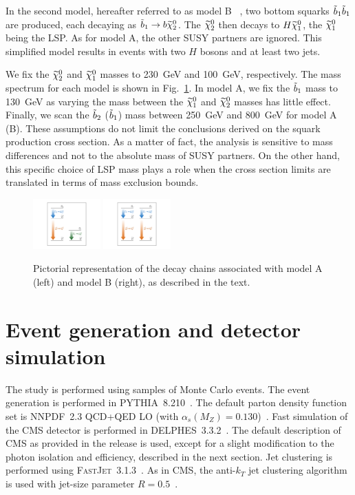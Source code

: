 In the second model, hereafter referred to as model B ~\cite{annthesis}, two bottom
squarks $\tilde{b}_1\tilde{b}_1$ are produced, each decaying as
$\tilde{b}_1 \to b \widetilde{\chi}^{0}_2$. The $\widetilde{\chi}^{0}_2$ then decays to $H
\widetilde{\chi}^{0}_1$, the $\widetilde{\chi}^{0}_1$ being the LSP. As for model A, the other SUSY
partners are ignored. This simplified model results
in events with two $H$ bosons and at least two jets.

We fix the $\widetilde{\chi}^{0}_2$ and $\widetilde{\chi}^{0}_1$ masses to 230~GeV
and 100~GeV, respectively. 
The mass spectrum for each model is shown in
Fig.~\ref{fig:simplifiedModels}.
In model A, %
we fix the $\tilde{b}_1$ mass to 130~GeV as varying the mass
between the $\widetilde{\chi}^{0}_1$ and $\widetilde{\chi}^{0}_2$ masses has little effect.
Finally, we scan the $\tilde{b}_2$ ($\tilde{b}_1$) mass between 250~GeV
and 800~GeV for model A (B). These assumptions do not limit the
conclusions derived on the squark production cross section. As a
matter of fact, the analysis is sensitive to mass differences and not
to the absolute mass of SUSY partners. On the other hand, this specific
choice of LSP mass plays a role when the cross section limits are
translated in terms of mass exclusion bounds.

\begin{figure}[htb]
\includegraphics[width=0.23\textwidth,viewport=250 100 800 700,clip=true]{figs/pheno/model1}
\includegraphics[width=0.23\textwidth,viewport=250 100 800 700,clip=true]{figs/pheno/model2}
\caption{\label{fig:simplifiedModels} Pictorial representation of the
  decay chains associated with model A (left) and model B (right), as described in the text.}
\end{figure}

\section{Event generation and detector simulation}
\label{sec:gensim}
The study is performed using samples of Monte Carlo events. The event generation is performed in \textsc{PYTHIA}~8.210~\cite{Pythia64,Pythia82}.
The default parton density function set is \textsc{NNPDF}~2.3 QCD+QED
LO (with $\alpha_s(M_Z) =
0.130$)~\cite{NNPDF1,NNPDF2,NNPDF3}. Fast simulation of the CMS
detector is performed in \textsc{DELPHES}~3.3.2~\cite{Delphes3}. The
default description of CMS as provided in the release is used, except
for a slight modification to the photon isolation and efficiency,
described in the next section. Jet clustering is performed using
\textsc{FastJet}~3.1.3~\cite{FastJet}. As in CMS, the anti-$k_T$ jet
clustering algorithm is used with jet-size parameter $R=0.5$~\cite{antikt}.

